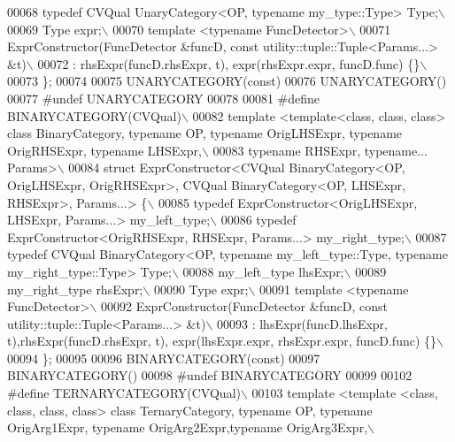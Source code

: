 \begin{DoxyCode}
00068 \textcolor{preprocessor}{  typedef CVQual UnaryCategory<OP, typename my\_type::Type> Type;\(\backslash\)}
00069 \textcolor{preprocessor}{  Type expr;\(\backslash\)}
00070 \textcolor{preprocessor}{  template <typename FuncDetector>\(\backslash\)}
00071 \textcolor{preprocessor}{  ExprConstructor(FuncDetector &funcD, const utility::tuple::Tuple<Params...> &t)\(\backslash\)}
00072 \textcolor{preprocessor}{  : rhsExpr(funcD.rhsExpr, t), expr(rhsExpr.expr, funcD.func) \{\}\(\backslash\)}
00073 \textcolor{preprocessor}{\};}
00074 
00075 UNARYCATEGORY(\textcolor{keyword}{const})
00076 UNARYCATEGORY()
00077 \textcolor{preprocessor}{#undef UNARYCATEGORY}
00078 
00081 \textcolor{preprocessor}{#define BINARYCATEGORY(CVQual)\(\backslash\)}
00082 \textcolor{preprocessor}{template <template<class, class, class> class BinaryCategory, typename OP, typename OrigLHSExpr, typename
       OrigRHSExpr, typename LHSExpr,\(\backslash\)}
00083 \textcolor{preprocessor}{typename RHSExpr, typename... Params>\(\backslash\)}
00084 \textcolor{preprocessor}{struct ExprConstructor<CVQual BinaryCategory<OP, OrigLHSExpr, OrigRHSExpr>,  CVQual BinaryCategory<OP,
       LHSExpr, RHSExpr>, Params...> \{\(\backslash\)}
00085 \textcolor{preprocessor}{  typedef  ExprConstructor<OrigLHSExpr, LHSExpr, Params...> my\_left\_type;\(\backslash\)}
00086 \textcolor{preprocessor}{  typedef  ExprConstructor<OrigRHSExpr, RHSExpr, Params...> my\_right\_type;\(\backslash\)}
00087 \textcolor{preprocessor}{  typedef  CVQual BinaryCategory<OP, typename my\_left\_type::Type, typename my\_right\_type::Type> Type;\(\backslash\)}
00088 \textcolor{preprocessor}{  my\_left\_type lhsExpr;\(\backslash\)}
00089 \textcolor{preprocessor}{  my\_right\_type rhsExpr;\(\backslash\)}
00090 \textcolor{preprocessor}{  Type expr;\(\backslash\)}
00091 \textcolor{preprocessor}{  template <typename FuncDetector>\(\backslash\)}
00092 \textcolor{preprocessor}{  ExprConstructor(FuncDetector &funcD, const utility::tuple::Tuple<Params...> &t)\(\backslash\)}
00093 \textcolor{preprocessor}{  : lhsExpr(funcD.lhsExpr, t),rhsExpr(funcD.rhsExpr, t), expr(lhsExpr.expr, rhsExpr.expr, funcD.func) \{\}\(\backslash\)}
00094 \textcolor{preprocessor}{\};}
00095 
00096 BINARYCATEGORY(\textcolor{keyword}{const})
00097 BINARYCATEGORY()
00098 \textcolor{preprocessor}{#undef BINARYCATEGORY}
00099 
00102 \textcolor{preprocessor}{#define TERNARYCATEGORY(CVQual)\(\backslash\)}
00103 \textcolor{preprocessor}{template <template <class, class, class, class> class TernaryCategory, typename OP, typename OrigArg1Expr,
       typename OrigArg2Expr,typename OrigArg3Expr,\(\backslash\)}

\end{DoxyCode}
